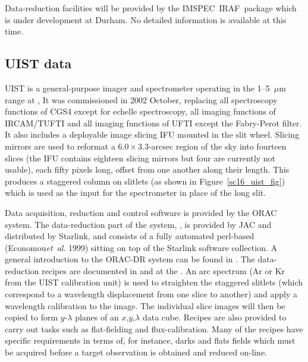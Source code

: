 \documentclass[twoside,11pt]{starlink}
\providecommand{\IMSPEC}{{\footnotesize IMSPEC}\normalsize}
\providecommand{\IRAF}{\footnotesize{IRAF}\normalsize}
\begin{document}
Data-reduction facilities will be provided by the \IMSPEC\ \IRAF\
package which is under development at Durham.  No detailed information
is available at this time.

\subsection{UIST data\label{sc16_uist}}

UIST is a general-purpose imager and spectrometer operating in the
1--5~$\mu$m range at
, It was
commissioned in 2002 October, replacing all spectroscopy functions of
CGS4 except for echelle spectroscopy, all imaging functions of
IRCAM/TUFTI and all imaging functions of UFTI except the Fabry-Perot
filter.  It also includes a deployable image slicing IFU mounted in
the slit wheel.  Slicing mirrors are used to reformat a
$6.0\times3.3$-arcsec region of the sky into fourteen slices (the IFU
contains eighteen slicing mirrors but four are currently not usable),
each fifty pixels long, offset from one another along their length.  This
produces a staggered column on slitlets (as shown in
Figure~\ref{sc16_uist_fig}) which is used as the input for the
spectrometer in place of the long slit.


Data acquisition, reduction and control software is provided by the
\htmladdnormallink{JAC}{http://www.jach.hawaii.edu/} ORAC system.  The
data-reduction part of the system,
,
is provided by JAC and distributed by Starlink, and consists of a
fully automated perl-based 
(Economou\emph{et~al}. 1999) sitting on top of the Starlink software
collection.  A general introduction to the ORAC-DR system can be found
in \xref{SUN/230}{sun230}{}.  The data-reduction recipes are
documented in  and at the
.
An arc spectrum (Ar or Kr from the UIST calibration unit) is used to
straighten the staggered slitlets (which correspond to a wavelength
displacement from one slice to another) and apply a wavelength
calibration to the image.  The individual slice images will then be
copied to form $y$-$\lambda$ planes of an $x$,$y$,$\lambda$ data cube.
Recipes are also provided to carry out tasks such as flat-fielding and
flux-calibration.  Many of the recipes have specific requirements in
terms of, for instance, darks and flats fields which must be acquired
before a target observation is obtained and reduced on-line.
\end{document}
